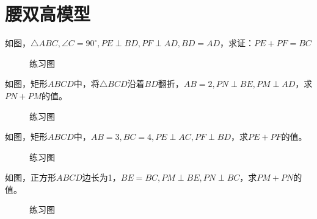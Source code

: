 \section{腰双高模型}
\begin{problem}
如图，$\triangle ABC,\angle C=90^\circ,PE\perp BD,PF\perp AD,BD=AD$，求证：$PE+PF=BC$
\end{problem}
\begin{figure}[H]
    \centering
    \resizebox{3cm}{!}{}
    \caption{练习图}
\end{figure}
\begin{problem}
如图，矩形$ABCD$中，将$\triangle BCD$沿着$BD$翻折，$AB=2,PN\perp BE,PM\perp AD$，求$PN+PM$的值。
\end{problem}
\begin{figure}[H]
    \centering
    \resizebox{3cm}{!}{}
    \caption{练习图}
\end{figure}
\begin{problem}
如图，矩形$ABCD$中，$AB=3,BC=4,PE\perp AC, PF\perp BD$，求$PE+PF$的值。
\end{problem}
\begin{figure}[H]
    \centering
    \resizebox{3cm}{!}{}
    \caption{练习图}
\end{figure}
\begin{problem}
如图，正方形$ABCD$边长为1，$BE=BC,PM\perp BE, PN\perp BC$，求$PM+PN$的值。
\end{problem}
\begin{figure}[H]
    \centering
    \resizebox{3cm}{!}{}
    \caption{练习图}
\end{figure}
\clearpage
